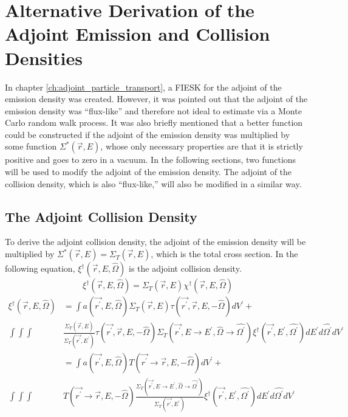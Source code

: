 \chapter{Alternative Derivation of the Adjoint Emission and Collision Densities}
\label{ch:appendix_a}

In chapter \ref{ch:adjoint_particle_transport}, a FIESK for the adjoint
of the emission density was created. However, it was pointed out that the 
adjoint of the emission density was ``flux-like'' and therefore not ideal to
estimate via a Monte Carlo random walk process. It was also briefly mentioned
that a better function could be constructed if the adjoint of the emission
density was multiplied by some function $\Sigma^{*}(\vec{r},E)$, whose only 
necessary properties are that it is strictly positive and goes to zero in a 
vacuum. In the following sections, two functions will be used to modify the 
adjoint of the emission density. The adjoint of the collision 
density, which is also ``flux-like,'' will also be modified in a similar way.

\section{The Adjoint Collision Density}
\label{sec:adjoint_collision_density}
To derive the adjoint collision density, the adjoint of the emission density
will be multiplied by $\Sigma^{*}(\vec{r},E) = \Sigma_T(\vec{r},E)$, which is 
the total cross section. In the following equation,
$\xi^{\dagger}(\vec{r},E,\hat{\Omega})$ is the adjoint collision density.
\begin{equation}
  \xi^{\dagger}(\vec{r},E,\hat{\Omega}) = \Sigma_T(\vec{r},E)
  \chi^{\dagger}(\vec{r},E,\hat{\Omega})
  \label{eq:adj_collision_dens_to_adjoint_of_emission_dens}
\end{equation}
\begin{align}
  \xi^{\dagger}(\vec{r},E,\hat{\Omega}) & = \int a(\vec{r^{'}},E,\hat{\Omega}) 
  \Sigma_T(\vec{r},E) \tau(\vec{r^{'}},\vec{r},E,-\hat{\Omega}) dV^{'} + 
  \nonumber \\
  \int\int\int  &\frac{\Sigma_T(\vec{r},E)}{\Sigma_T(\vec{r^{'}},E^{'})}
  \tau(\vec{r^{'}},\vec{r},E,-\hat{\Omega}) 
  \Sigma_T(\vec{r^{'}},E \to E^{'},\hat{\Omega} \to \hat{\Omega^{'}})
  \xi^{\dagger}(\vec{r^{'}},E^{'},\hat{\Omega^{'}}) dE^{'}d\hat{\Omega^{'}}dV^{'}
  \nonumber \\
  & = \int a(\vec{r^{'}},E,\hat{\Omega}) 
    T(\vec{r^{'}} \to \vec{r},E,-\hat{\Omega}) dV^{'} + \nonumber \\
    \int\int\int & T(\vec{r^{'}} \to \vec{r},E,-\hat{\Omega})
      \frac{\Sigma_T(\vec{r^{'}},E \to E^{'},\hat{\Omega} \to \hat{\Omega^{'}})}
           {\Sigma_T(\vec{r^{'}},E^{'})}
    \xi^{\dagger}(\vec{r^{'}},E^{'},\hat{\Omega^{'}}) dE^{'}d\hat{\Omega^{'}}dV^{'}
  \nonumber 
\end{align}


